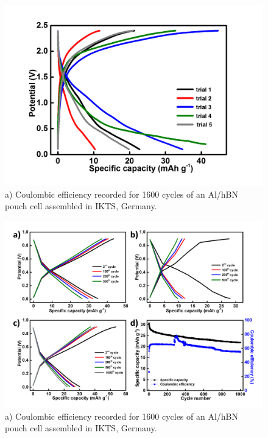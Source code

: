 \begin{figure}[tbh!]
\centering
\includegraphics[width=\textwidth]{Figures/appendix/hBNmultiattempts}
\caption{a) Coulombic efficiency recorded for 1600 cycles of an Al/hBN pouch cell assembled in IKTS, Germany.}
\label{Figures/appendix:hBNmultiattempts}
\end{figure}
\begin{figure}[tbh!]
\centering
\includegraphics[width=\textwidth]{Figures/appendix/pouchcellCDCCE}
\caption{a) Coulombic efficiency recorded for 1600 cycles of an Al/hBN pouch cell assembled in IKTS, Germany.}
\label{Figures/appendix:pouchcellCDCCE}
\end{figure}
